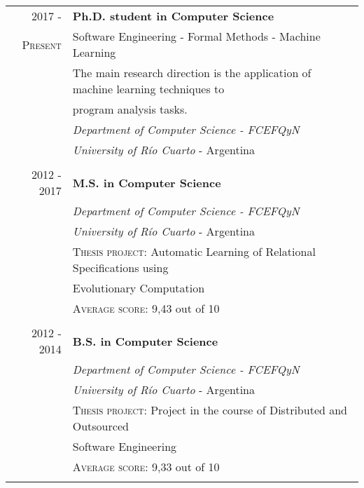 \documentclass[a4paper,10pt]{article} %
\begin{document}
\begin{tabular}{rl}
\\
\textsc{2017 -}	& \textbf{Ph.D. student in Computer Science} \\
\textsc{Present}  & Software Engineering - Formal Methods - Machine Learning \\
& The main research direction is the application of machine learning techniques to \\ 
& program analysis tasks. \\
& \textit{Department of Computer Science - FCEFQyN} \\ & \textit{University of Río Cuarto} - Argentina \\ & \\

\textsc{2012 - 2017}	& \textbf{M.S. in Computer Science} \\
 & \textit{Department of Computer Science - FCEFQyN} \\ & \textit{University of Río Cuarto} - Argentina \\ 
& \textsc{Thesis project:} Automatic Learning of Relational Specifications using \\ & Evolutionary Computation \\ & \textsc{Average score:} 9,43 out of 10 \\ & \\

\textsc{2012 - 2014}	& \textbf{B.S. in Computer Science} \\
 					& \textit{Department of Computer Science - FCEFQyN} \\ & \textit{University of Río Cuarto} - Argentina \\
& \textsc{Thesis project:} Project in the course of Distributed and Outsourced \\ & Software Engineering \\ & \textsc{Average score:} 9,33 out of 10 \\ \\ 

\end{tabular}
\end{document}
